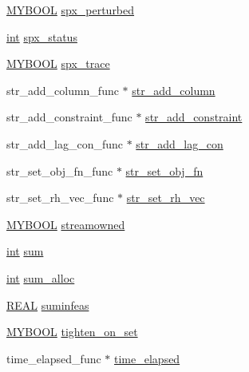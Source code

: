 \begin{DoxyCompactItemize}
\item 
\hyperlink{lp__lib_8h_aad848328fb3018217ac9f01d97b6bd88}{M\+Y\+B\+O\+OL} \hyperlink{struct__lprec_a93759187e48d4bd16b533441a63b3748}{spx\+\_\+perturbed}
\item 
\hyperlink{lp__lib_8h_adeb9ec6400320e4923ac9d836d509ddb}{int} \hyperlink{struct__lprec_a78827d380126336cc4b8dc36782f1296}{spx\+\_\+status}
\item 
\hyperlink{lp__lib_8h_aad848328fb3018217ac9f01d97b6bd88}{M\+Y\+B\+O\+OL} \hyperlink{struct__lprec_a2fb4a7328f40e02a7cee0bc1df64c5ae}{spx\+\_\+trace}
\item 
str\+\_\+add\+\_\+column\+\_\+func $\ast$ \hyperlink{struct__lprec_acdac9d02b5256b1b39333fa8e136e72c}{str\+\_\+add\+\_\+column}
\item 
str\+\_\+add\+\_\+constraint\+\_\+func $\ast$ \hyperlink{struct__lprec_a1fa8895d543949f24e8dcf5190e79aee}{str\+\_\+add\+\_\+constraint}
\item 
str\+\_\+add\+\_\+lag\+\_\+con\+\_\+func $\ast$ \hyperlink{struct__lprec_afba05c28583e2b73487947c630590f32}{str\+\_\+add\+\_\+lag\+\_\+con}
\item 
str\+\_\+set\+\_\+obj\+\_\+fn\+\_\+func $\ast$ \hyperlink{struct__lprec_a6c55e97c4700857c172b5d37d360b0da}{str\+\_\+set\+\_\+obj\+\_\+fn}
\item 
str\+\_\+set\+\_\+rh\+\_\+vec\+\_\+func $\ast$ \hyperlink{struct__lprec_a187822540222ea7ac15a3b5ac604ac56}{str\+\_\+set\+\_\+rh\+\_\+vec}
\item 
\hyperlink{lp__lib_8h_aad848328fb3018217ac9f01d97b6bd88}{M\+Y\+B\+O\+OL} \hyperlink{struct__lprec_a79186ec76db2a9bb2425292b3837e1b3}{streamowned}
\item 
\hyperlink{lp__lib_8h_adeb9ec6400320e4923ac9d836d509ddb}{int} \hyperlink{struct__lprec_a5914de6f675046a8cf948c3183ecb147}{sum}
\item 
\hyperlink{lp__lib_8h_adeb9ec6400320e4923ac9d836d509ddb}{int} \hyperlink{struct__lprec_ae090d9c999e5cefb6d56896d59fafdd8}{sum\+\_\+alloc}
\item 
\hyperlink{lp__lib_8h_a92bd5e363d131fa73669358edb232dce}{R\+E\+AL} \hyperlink{struct__lprec_a05c98b5e2a1a6a6f3182f16d911bfb29}{suminfeas}
\item 
\hyperlink{lp__lib_8h_aad848328fb3018217ac9f01d97b6bd88}{M\+Y\+B\+O\+OL} \hyperlink{struct__lprec_aa743a4c67ef1ae575b43e1f6de44e39c}{tighten\+\_\+on\+\_\+set}
\item 
time\+\_\+elapsed\+\_\+func $\ast$ \hyperlink{struct__lprec_a0fb1a1c3c20edb15397c1439a62bbdbd}{time\+\_\+elapsed}

\end{DoxyCompactItemize}
